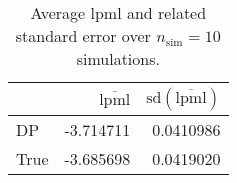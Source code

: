 \begin{table}[H]

\caption{Average lpml and related standard error over $n_{\text{sim}} = 10$ simulations.}
\centering
\begin{tabular}[t]{lrr}
\toprule
  & $\overbar{\text{lpml}}$ & $\text{sd}(\overbar{\text{lpml}})$\\
\midrule
DP & -3.714711 & 0.0410986\\
True & -3.685698 & 0.0419020\\
\bottomrule
\end{tabular}
\end{table}